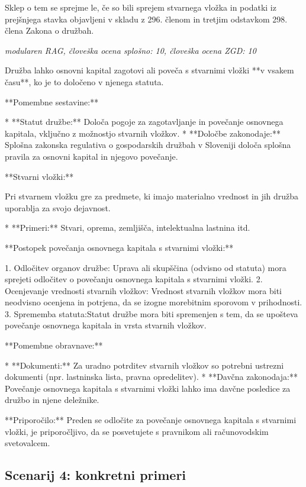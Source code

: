\documentclass[a4paper,12pt,openright]{book}
\begin{document}
Sklep o tem se sprejme le, če so bili sprejem stvarnega vložka in podatki iz prejšnjega stavka objavljeni v skladu z 296. členom in tretjim odstavkom 298. člena Zakona o družbah.

\vspace{0.5cm}
\textit{modularen RAG, človeška ocena splošno: 10, človeška ocena ZGD: 10}

Družba lahko osnovni kapital zagotovi ali poveča s stvarnimi vložki **v vsakem času**, ko je to določeno v njenega statuta.

**Pomembne sestavine:**

* **Statut družbe:** Določa pogoje za zagotavljanje in povečanje osnovnega kapitala, vključno z možnostjo stvarnih vložkov.
* **Določbe zakonodaje:** Splošna zakonska regulativa o gospodarskih družbah v Sloveniji določa splošna pravila za osnovni kapital in njegovo povečanje.

**Stvarni vložki:**

Pri stvarnem vložku gre za predmete, ki imajo materialno vrednost in jih družba uporablja za svojo dejavnost.

* **Primeri:** Stvari, oprema, zemljišča, intelektualna lastnina itd.

**Postopek povečanja osnovnega kapitala s stvarnimi vložki:**

1. Odločitev organov družbe: Uprava ali skupščina (odvisno od statuta) mora sprejeti odločitev o povečanju osnovnega kapitala s stvarnimi vložki.
2. Ocenjevanje vrednosti stvarnih vložkov: Vrednost stvarnih vložkov mora biti neodvisno ocenjena in potrjena, da se izogne morebitnim sporovom v prihodnosti.
3. Sprememba statuta:Statut družbe mora biti spremenjen s tem, da se upošteva povečanje osnovnega kapitala in vrsta stvarnih vložkov.

**Pomembne obravnave:**

* **Dokumenti:** Za uradno potrditev stvarnih vložkov so potrebni ustrezni dokumenti (npr. lastninska lista, pravna opredelitev).
* **Davčna zakonodaja:** Povečanje osnovnega kapitala s stvarnimi vložki lahko ima davčne posledice za družbo in njene deležnike.

**Priporočilo:** Preden se odločite za povečanje osnovnega kapitala s stvarnimi vložki, je priporočljivo, da se posvetujete s pravnikom ali računovodskim svetovalcem.

\subsection*{Scenarij 4: konkretni primeri}
\end{document}
